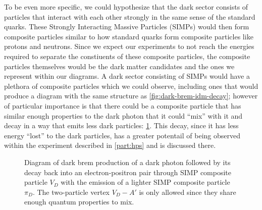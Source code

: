 To be even more specific, we could hypothesize that the dark sector consists of particles that
interact with each other strongly in the same sense of the standard quarks. These Strongly
Interacting Massive Particles (SIMPs) \cite{simp-mechanism-2014,simp-pheno-2018} would then form composite particles similar to how standard
quarks form composite particles like protons and neutrons. Since we expect our experiments to
not reach the energies required to separate the constiuents of these composite particles,
the composite particles themselves would be the dark matter candidates and the ones we represent
within our diagrams. A dark sector consisting of SIMPs would have a plethora of composite particles
which we could observe, including ones that would produce a diagram with the same structure as
\cref{fig:dark-brem-idm-decay}; however of particular importance is that there could be a composite
particle that has similar enough properties to the dark photon that it could ``mix'' with it and
decay in a way that emits less dark particles: \cref{fig:dark-brem-simp-decay}. This decay, since
it has less energy ``lost'' to the dark particles, has a greater potentail of being observed within
the experiment described in \cref{part:hps} and is discussed there.

\begin{figure}
	\centering
	\caption{
		Diagram of dark brem production of a dark photon followed by its decay back into an electron-positron pair
		through SIMP composite particle $V_D$ with the emission of a lighter SIMP composite particle $\pi_D$.
		The two-particle vertex $V_D-A'$ is only allowed since they share enough quantum properties to mix.
	}
	\label{fig:dark-brem-simp-decay}
\end{figure}


